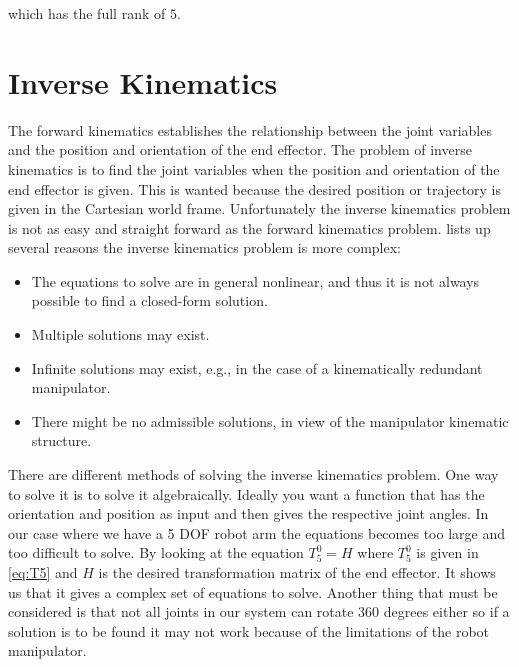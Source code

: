 which has the full rank of $5$. 

















\section{Inverse Kinematics}
The forward kinematics establishes the relationship between the joint variables and the position and orientation of the end effector. The problem of inverse kinematics is to find the joint variables when the position and orientation of the end effector is given. This is wanted because the desired position or trajectory is given in the Cartesian world frame. Unfortunately the inverse kinematics problem is not as easy and straight forward as the forward kinematics problem. \cite{Siciliano} lists up several reasons the inverse kinematics problem is more complex:
\begin{itemize}
    \item The equations to solve are in general nonlinear, and thus it is not always possible to find a closed-form solution.
    \item Multiple solutions may exist.
    \item Infinite solutions may exist, e.g., in the case of a kinematically redundant manipulator.
    \item There might be no admissible solutions, in view of the manipulator kinematic structure.
\end{itemize}
There are different methods of solving the inverse kinematics problem. One way to solve it is to solve it algebraically. Ideally you want a function that has the orientation and position as input and then gives the respective joint angles. In our case where we have a 5 DOF robot arm the equations becomes too large and too difficult to solve\cite{spong}. By looking at the equation $T_5^0=H$ where $T_5^0$ is given in \eqref{eq:T5} and $H$ is the desired transformation matrix of the end effector. It shows us that it gives a complex set of equations to solve. Another thing that must be considered is that not all joints in our system can rotate 360 degrees either so if a solution is to be found it may not work because of the limitations of the robot manipulator. \\\\
